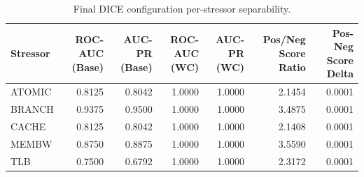 \begin{table}[t]
\centering
\caption{Final DICE configuration per-stressor separability.}
\label{tab:dice_full_stressor}
\footnotesize
\begin{tabular}{lrrrrrr}
\toprule
Stressor & ROC-AUC (Base) & AUC-PR (Base) & ROC-AUC (WC) & AUC-PR (WC) & Pos/Neg Score Ratio & Pos-Neg Score Delta \\
\midrule
ATOMIC & 0.8125 & 0.8042 & 1.0000 & 1.0000 & 2.1454 & 0.0001 \\
BRANCH & 0.9375 & 0.9500 & 1.0000 & 1.0000 & 3.4875 & 0.0001 \\
CACHE & 0.8125 & 0.8042 & 1.0000 & 1.0000 & 2.1408 & 0.0001 \\
MEMBW & 0.8750 & 0.8875 & 1.0000 & 1.0000 & 3.5590 & 0.0001 \\
TLB & 0.7500 & 0.6792 & 1.0000 & 1.0000 & 2.3172 & 0.0001 \\
\bottomrule
\end{tabular}

\end{table}
